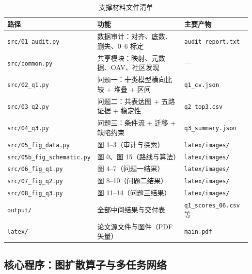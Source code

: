 \begin{table}[H]
\centering
\caption{支撑材料文件清单}
\label{tab:files}
\small
\begin{fittable}
\begin{tabular}{@{}lll@{}}
\toprule
路径 & 功能 & 主要产物 \\
\midrule
\texttt{src/01\_audit.py} & 数据审计：对齐、底数、删失、0--6 标定 & \texttt{audit\_report.txt} \\
\texttt{src/common.py} & 共享模块：映射、元数据、OAV、社区发现 & --- \\
\texttt{src/02\_q1.py} & 问题一：十类模型横向比较 + 堆叠 + 区间 & \texttt{q1\_cv.json} \\
\texttt{src/03\_q2.py} & 问题二：共表达图 + 五路证据 + 稳定性 & \texttt{q2\_top3.csv} \\
\texttt{src/04\_q3.py} & 问题三：条件流 + 迁移 + 缺陷约束 & \texttt{q3\_summary.json} \\
\texttt{src/05\_fig\_data.py} & 图 1--3（审计与探索） & \texttt{latex/images/} \\
\texttt{src/05b\_fig\_schematic.py} & 图 0、图 15（路线与算法） & \texttt{latex/images/} \\
\texttt{src/06\_fig\_q1.py} & 图 4--7（问题一结果） & \texttt{latex/images/} \\
\texttt{src/07\_fig\_q2.py} & 图 8--10（问题二结果） & \texttt{latex/images/} \\
\texttt{src/08\_fig\_q3.py} & 图 11--14（问题三结果） & \texttt{latex/images/} \\
\texttt{output/} & 全部中间结果与交付表 & \texttt{q1\_scores\_06.csv} 等 \\
\texttt{latex/} & 论文源文件与图件（PDF 矢量） & \texttt{main.pdf} \\
\bottomrule
\end{tabular}
\end{fittable}
\end{table}

\subsection{核心程序：图扩散算子与多任务网络}

